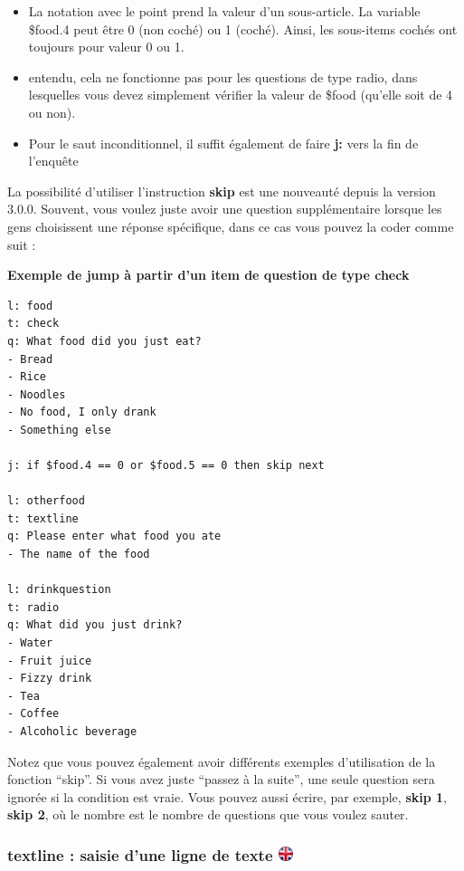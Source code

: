 \documentclass[
]{book}
\providecommand{\tightlist}{%
  \setlength{\itemsep}{0pt}\setlength{\parskip}{0pt}}
\begin{document}
\begin{itemize}
\tightlist
\item
  La notation avec le point prend la valeur d'un sous-article. La
  variable \$food.4 peut être 0 (non coché) ou 1 (coché). Ainsi, les
  sous-items cochés ont toujours pour valeur 0 ou 1.
\item
  entendu, cela ne fonctionne pas pour les questions de type radio, dans
  lesquelles vous devez simplement vérifier la valeur de \$food (qu'elle
  soit de 4 ou non).
\item
  Pour le saut inconditionnel, il suffit également de faire \textbf{j:}
  vers la fin de l'enquête
\end{itemize}

La possibilité d'utiliser l'instruction \textbf{skip} est une nouveauté
depuis la version 3.0.0. Souvent, vous voulez juste avoir une question
supplémentaire lorsque les gens choisissent une réponse spécifique, dans
ce cas vous pouvez la coder comme suit :

\textbf{Exemple de jump à partir d'un item de question de type check}

\begin{verbatim}
l: food
t: check
q: What food did you just eat?
- Bread
- Rice
- Noodles
- No food, I only drank
- Something else

j: if $food.4 == 0 or $food.5 == 0 then skip next

l: otherfood
t: textline
q: Please enter what food you ate
- The name of the food

l: drinkquestion
t: radio
q: What did you just drink?
- Water
- Fruit juice
- Fizzy drink
- Tea
- Coffee
- Alcoholic beverage
\end{verbatim}

Notez que vous pouvez également avoir différents exemples d'utilisation
de la fonction ``skip''. Si vous avez juste ``passez à la suite'', une
seule question sera ignorée si la condition est vraie. Vous pouvez aussi
écrire, par exemple, \textbf{skip 1}, \textbf{skip 2}, où le nombre est
le nombre de questions que vous voulez sauter.

\hypertarget{textline-saisie-dune-ligne-de-texte}{%
\subsubsection[textline : saisie d'une ligne de texte
]{\texorpdfstring{textline : saisie d'une ligne de texte
\href{https://www.psytoolkit.org/doc3.1.0/online-survey-syntax.html\#textline}{\protect\includegraphics{img/ukflag.png}}}{textline : saisie d'une ligne de texte }}\label{textline-saisie-dune-ligne-de-texte}}
\end{document}

